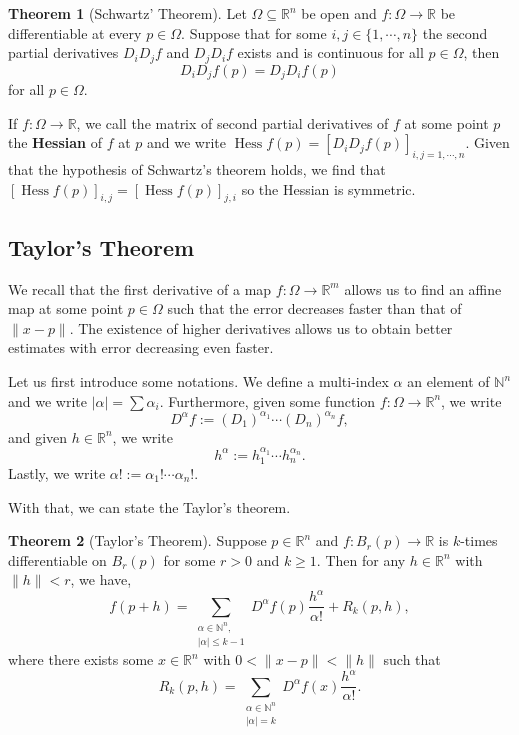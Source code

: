 \documentclass[
]{article}
\theoremstyle{definition}
\newtheorem{theorem}{Theorem}
\theoremstyle{definition}
\begin{document}
\begin{theorem}[Schwartz' Theorem]
  Let \(\Omega \subseteq \mathbb{R}^n\) be open and \(f : \Omega \to \mathbb{R}\) 
  be differentiable at every \(p \in \Omega\). Suppose that for some 
  \(i, j \in \{1, \cdots, n\}\) the second partial derivatives \(D_i D_j f\) and 
  \(D_j D_i f\) exists and is continuous for all \(p \in \Omega\), then 
  \[D_i D_j f(p) = D_j D_i f(p)\]
  for all \(p \in \Omega\).
\end{theorem}

If \(f : \Omega \to \mathbb{R}\), we call the matrix of second partial
derivatives of \(f\) at some point \(p\) the \textbf{Hessian} of \(f\)
at \(p\) and we write
\(\mathop{\mathrm{Hess}}f(p) = [D_i D_j f(p)]_{i, j = 1, \cdots, n}\).
Given that the hypothesis of Schwartz's theorem holds, we find that
\([\mathop{\mathrm{Hess}}f(p)]_{i, j} = [\mathop{\mathrm{Hess}}f(p)]_{j, i}\)
so the Hessian is symmetric.

\hypertarget{taylors-theorem}{%
\subsection{Taylor's Theorem}\label{taylors-theorem}}

We recall that the first derivative of a map
\(f : \Omega \to \mathbb{R}^m\) allows us to find an affine map at some
point \(p \in \Omega\) such that the error decreases faster than that of
\(\| x - p\|\). The existence of higher derivatives allows us to obtain
better estimates with error decreasing even faster.

Let us first introduce some notations. We define a multi-index
\(\alpha\) an element of \(\mathbb{N}^n\) and we write
\(\left| \alpha \right| = \sum \alpha_i\). Furthermore, given some
function \(f : \Omega \to \mathbb{R}^n\), we write
\[D^\alpha f := (D_1)^{\alpha_1}\cdots(D_n)^{\alpha_n} f,\] and given
\(h \in \mathbb{R}^n\), we write
\[h^\alpha := h_1 ^ {\alpha_1} \cdots h_n^{\alpha_n}.\] Lastly, we write
\(\alpha! := \alpha_1! \cdots \alpha_n!\).

With that, we can state the Taylor's theorem.

\begin{theorem}[Taylor's Theorem]
  Suppose \(p \in \mathbb{R}^n\) and \(f : B_r(p) \to \mathbb{R}\) is \(k\)-times
  differentiable on \(B_r(p)\) for some \(r > 0\) and \(k \ge 1\). Then for any 
  \(h \in \mathbb{R}^n\) with \(\|h\| < r\), we have,
  \[
    f(p + h) = \sum_{\substack{\alpha \in \mathbb{N}^n,\\ \left|\alpha\right| \le k - 1}} 
      D^\alpha f(p) \frac{h^\alpha}{\alpha!} + R_k(p, h),
  \]
  where there exists some \(x \in \mathbb{R}^n\) with \(0 < \| x - p\| < \| h \|\)
  such that 
  \[
    R_k(p, h) = \sum_{\substack{\alpha \in \mathbb{N}^n \\ \left| \alpha \right| = k}} 
      D^\alpha f(x)\frac{h^\alpha}{\alpha!}.
  \]
\end{theorem}
\proof
\end{document}
